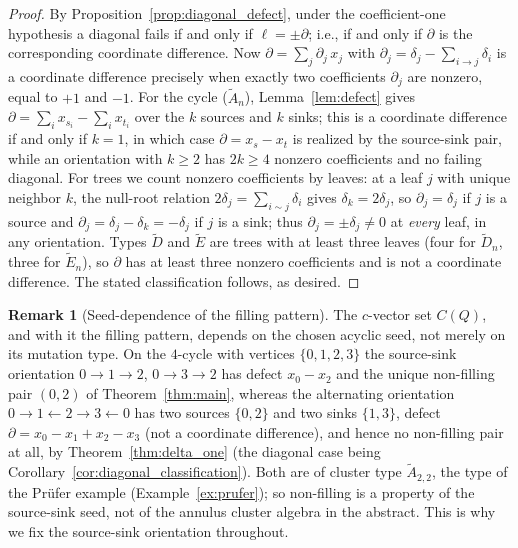 \documentclass[11pt, a4paper]{amsart}
\theoremstyle{definition}
\newtheorem{remark}[theorem]{Remark}
\begin{document}
\begin{proof}
By Proposition~\ref{prop:diagonal_defect}, under the coefficient-one
hypothesis a diagonal fails if and only if $\ell = \pm\partial$; i.e., if
and only if $\partial$ is the corresponding coordinate difference. Now
$\partial = \sum_j \partial_j\, x_j$ with
$\partial_j = \delta_j - \sum_{i \to j}\delta_i$ is a coordinate difference
precisely when exactly two coefficients $\partial_j$ are nonzero, equal to
$+1$ and $-1$. For the cycle ($\widetilde{A}_n$), Lemma~\ref{lem:defect}
gives $\partial = \sum_i x_{s_i} - \sum_i x_{t_i}$ over the $k$ sources and
$k$ sinks; this is a coordinate difference if and only if $k = 1$, in
which case
$\partial = x_s - x_t$ is realized by the source-sink pair, while an
orientation with $k \geq 2$ has $2k \geq 4$ nonzero coefficients and no
failing diagonal. For trees we count nonzero coefficients by leaves: at a
leaf $j$ with unique neighbor $k$, the null-root relation $2\delta_j =
\sum_{i \sim j}\delta_i$ gives $\delta_k = 2\delta_j$, so $\partial_j =
\delta_j$ if $j$ is a source and $\partial_j = \delta_j - \delta_k =
-\delta_j$ if $j$ is a sink; thus $\partial_j = \pm\delta_j \neq 0$ at
\emph{every} leaf, in any orientation. Types $\widetilde{D}$ and
$\widetilde{E}$ are trees with at least three leaves \textup{(}four for
$\widetilde{D}_n$, three for $\widetilde{E}_n$\textup{)}, so $\partial$ has
at least three nonzero coefficients and is not a coordinate difference. The
stated classification follows, as desired.
\end{proof}

\begin{remark}[Seed-dependence of the filling pattern]
\label{rem:seed_dependence}
The $c$-vector set $C(Q)$, and with it the filling pattern, depends on the
chosen acyclic seed, not merely on its mutation type. On the $4$-cycle with
vertices $\{0, 1, 2, 3\}$ the source-sink orientation $0 \to 1 \to 2$,
$0 \to 3 \to 2$ has defect $x_0 - x_2$ and the unique non-filling pair
$(0, 2)$ of Theorem~\ref{thm:main}, whereas the alternating orientation
$0 \to 1 \leftarrow 2 \to 3 \leftarrow 0$ has two sources $\{0, 2\}$ and two
sinks $\{1, 3\}$, defect $\partial = x_0 - x_1 + x_2 - x_3$ \textup{(}not a
coordinate difference\textup{)}, and hence no non-filling pair at all, by
Theorem~\ref{thm:delta_one} \textup{(}the diagonal case being
Corollary~\ref{cor:diagonal_classification}\textup{)}. Both are of cluster type
$\widetilde{A}_{2, 2}$, the type of the Pr\"ufer example
\textup{(}Example~\ref{ex:prufer}\textup{)}; so non-filling is a property of
the source-sink seed, not of the annulus cluster algebra in the abstract.
This is why we fix the source-sink orientation throughout.
\end{remark}
\end{document}
